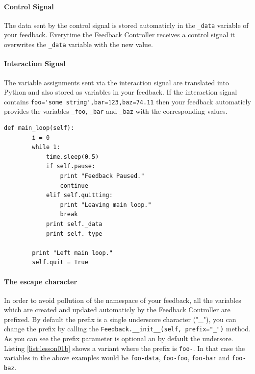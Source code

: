 \paragraph{Control Signal} The data sent by the control signal is stored automaticly in the \lstinline+_data+ variable of your feedback. Everytime the Feedback Controller receives a control signal it overwrites the \lstinline+_data+ variable with the new value.

\paragraph{Interaction Signal} The variable assignments sent via the interaction signal are translated into Python and also stored as variables in your feedback. If the interaction signal contains \verb+foo='some string',bar=123,baz=74.11+ then your feedback automaticly provides the variables \lstinline+_foo+, \lstinline+_bar+ and \lstinline+_baz+ with the corresponding values.

\begin{lstlisting}[caption=Accessing control- and interaction data., label={list:lesson03}]
    def main_loop(self):
        i = 0
        while 1:
            time.sleep(0.5)
            if self.pause:
                print "Feedback Paused."
                continue
            elif self.quitting:
                print "Leaving main loop."
                break
            print self._data
            print self._type
            
        print "Left main loop."
        self.quit = True
\end{lstlisting}

\paragraph{The escape character} In order to avoid pollution of the namespace of your feedback, all the variables which are created and updated automaticly by the Feedback Controller are prefixed. By default the prefix is a single underscore character ("\_"), you can change the prefix by calling the \lstinline+Feedback.__init__(self, prefix="_")+ method. As you can see the prefix parameter is optional an by default the undersore. Listing \ref{list:lesson01b} shows a variant where the prefix is \verb+foo-+. In that case the variables in the above examples would be \lstinline+foo-data+, \lstinline+foo-foo+, \lstinline+foo-bar+ and \lstinline+foo-baz+.

